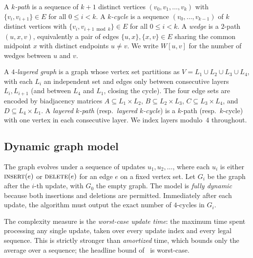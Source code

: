 \documentclass[sigconf,nonacm]{acmart}
\theoremstyle{plain}
\theoremstyle{definition}
\begin{document}
A \emph{$k$-path} is a sequence of $k+1$ distinct vertices
$(v_0, v_1, \dots, v_k)$ with $\{v_i, v_{i+1}\} \in E$ for all
$0 \le i < k$. A \emph{$k$-cycle} is a sequence
$(v_0, \dots, v_{k-1})$ of $k$ distinct vertices with
$\{v_i, v_{i+1\bmod k}\} \in E$ for all $0 \le i < k$.
A \emph{wedge} is a $2$-path $(u, x, v)$, equivalently a pair of
edges $\{u, x\}, \{x, v\} \in E$ sharing the common midpoint $x$
with distinct endpoints $u \neq v$. We write $W[u, v]$ for the
number of wedges between $u$ and $v$.

A \emph{$4$-layered graph} is a graph whose vertex set partitions as
$V = L_1 \cup L_2 \cup L_3 \cup L_4$, with each $L_i$ an independent set
and edges only between consecutive layers $L_i, L_{i+1}$ (and between
$L_4$ and $L_1$, closing the cycle). The four edge sets are encoded by
biadjacency matrices $A \subseteq L_1 \times L_2$, $B \subseteq L_2 \times L_3$,
$C \subseteq L_3 \times L_4$, and $D \subseteq L_4 \times L_1$.
A \emph{layered $k$-path} (resp.\ \emph{layered $k$-cycle}) is a $k$-path
(resp.\ $k$-cycle) with one vertex in each consecutive layer. We index
layers modulo~$4$ throughout.

\subsection{Dynamic graph model}
\label{sec:prelim:dynamic}
The graph evolves under a sequence of updates $u_1, u_2, \dots$, where
each $u_i$ is either $\textsc{insert}(e)$ or $\textsc{delete}(e)$ for an
edge $e$ on a fixed vertex set. Let $G_i$ be the graph after the $i$-th
update, with $G_0$ the empty graph. The model is \emph{fully dynamic}
because both insertions and deletions are permitted. Immediately after
each update, the algorithm must output the exact number of $4$-cycles
in $G_i$.

The complexity measure is the \emph{worst-case update time}: the maximum
time spent processing any single update, taken over every update index
and every legal sequence. This is strictly stronger than \emph{amortized}
time, which bounds only the average over a sequence; the headline bound
of~\cite{AssadiShah25} is worst-case.
\end{document}
